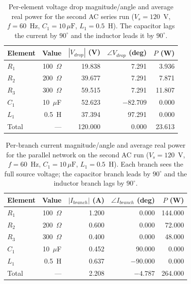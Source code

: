 \documentclass[11pt]{article}
\begin{document}
\begin{table}[h]
\centering
\caption{Per-element voltage drop magnitude/angle and average real power
for the second AC series run ($V_s = 120$~V, $f = 60$~Hz,
$C_1 = 10\,\mu\mathrm{F}$, $L_1 = 0.5$~H). The capacitor lags the current
by $90^{\circ}$ and the inductor leads it by $90^{\circ}$.}
\begin{tabular}{@{}lrrrr@{}}
\toprule
Element & Value & $|V_{drop}|$ (V) & $\angle V_{drop}$ (deg) & $P$ (W)\\
\midrule
$R_1$ & 100~$\Omega$        & 19.838 &   7.291 &  3.936 \\
$R_2$ & 200~$\Omega$        & 39.677 &   7.291 &  7.871 \\
$R_3$ & 300~$\Omega$        & 59.515 &   7.291 & 11.807 \\
$C_1$ & 10~$\mu$F           & 52.623 & $-82.709$ &  0.000 \\
$L_1$ & 0.5~H               & 37.394 &  97.291 &  0.000 \\
\midrule
Total & ---                 & 120.000 & 0.000 & 23.613 \\
\bottomrule
\end{tabular}
\end{table}

\begin{table}[h]
\centering
\caption{Per-branch current magnitude/angle and average real power for the
parallel network on the second AC run ($V_s = 120$~V, $f = 60$~Hz,
$C_1 = 10\,\mu\mathrm{F}$, $L_1 = 0.5$~H). Each branch sees the full
source voltage; the capacitor branch leads by $90^{\circ}$ and the
inductor branch lags by $90^{\circ}$.}
\begin{tabular}{@{}lrrrr@{}}
\toprule
Element & Value & $|I_{branch}|$ (A) & $\angle I_{branch}$ (deg) & $P$ (W)\\
\midrule
$R_1$ & 100~$\Omega$ & 1.200 &   0.000 & 144.000 \\
$R_2$ & 200~$\Omega$ & 0.600 &   0.000 &  72.000 \\
$R_3$ & 300~$\Omega$ & 0.400 &   0.000 &  48.000 \\
$C_1$ & 10~$\mu$F    & 0.452 &  90.000 &   0.000 \\
$L_1$ & 0.5~H        & 0.637 & $-90.000$ &   0.000 \\
\midrule
Total & ---          & 2.208 & $-4.787$ & 264.000 \\
\bottomrule
\end{tabular}
\end{table}
\end{document}
